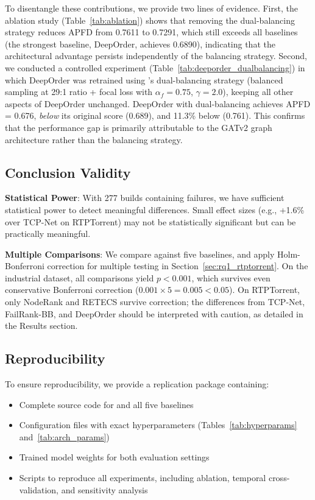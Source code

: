 To disentangle these contributions, we provide two lines of evidence. First,
the ablation study (Table~\ref{tab:ablation}) shows that removing the
dual-balancing strategy reduces APFD from 0.7611 to 0.7291, which still
exceeds all baselines (the strongest baseline, DeepOrder, achieves 0.6890),
indicating that the architectural advantage persists independently of the
balancing strategy. Second, we conducted a controlled experiment
(Table~\ref{tab:deeporder_dualbalancing}) in which DeepOrder was retrained
using \filopriori{}'s dual-balancing strategy (balanced sampling at 29:1
ratio + focal loss with $\alpha_f = 0.75$, $\gamma = 2.0$), keeping all
other aspects of DeepOrder unchanged. DeepOrder with dual-balancing
achieves APFD = 0.676, \emph{below} its original score (0.689), and 11.3\%
below \filopriori{} (0.761). This confirms that the performance gap is
primarily attributable to the GATv2 graph architecture rather than the
balancing strategy.

\subsection{Conclusion Validity}

\textbf{Statistical Power}: With 277 builds containing failures, we have
sufficient statistical power to detect meaningful differences. Small effect
sizes (e.g., +1.6\% over TCP-Net on RTPTorrent) may not be statistically
significant but can be practically meaningful.

\textbf{Multiple Comparisons}: We compare against five baselines, and
apply Holm-Bonferroni correction for multiple testing in
Section~\ref{sec:rq1_rtptorrent}. On the industrial dataset, all comparisons
yield $p < 0.001$, which survives even conservative Bonferroni correction
($0.001 \times 5 = 0.005 < 0.05$). On RTPTorrent, only NodeRank and
RETECS survive correction; the differences from TCP-Net, FailRank-BB, and
DeepOrder should be interpreted with caution, as detailed in the Results
section.

\subsection{Reproducibility}

To ensure reproducibility, we provide a replication package containing:
\begin{itemize}
    \item Complete source code for \filopriori{} and all five baselines
    \item Configuration files with exact hyperparameters
    (Tables~\ref{tab:hyperparams} and~\ref{tab:arch_params})
    \item Trained model weights for both evaluation settings
    \item Scripts to reproduce all experiments, including ablation,
    temporal cross-validation, and sensitivity analysis
\end{itemize}

